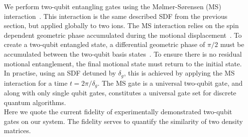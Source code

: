     We perform two-qubit entangling gates using the Mølmer-Sørensen (MS)
    interaction~\cite{sorensen2000entanglement}. This interaction is the same described SDF from the
    previous section, but applied globally to two ions. The MS interaction
    relies on the spin dependent geometric phase accumulated during the motional
    displacement~\cite{ozeri2011tutorial}. To create a two-qubit entangled state, a differential
    geometric phase of $\pi/2$ must be accumulated between the two-qubit basis
    states~\cite{ozeri2011tutorial}. To ensure there is no residual motional entanglement, the final
    motional state must return to the initial state. In practise, using an SDF
    detuned by $\delta_g$, this is achieved by applying the MS interaction for a
    time $t = 2\pi/\delta_g$. The MS gate is a universal two-qubit gate, and
    along with only single qubit gates, constitutes a universal gate set for
    discrete quantum algorithms.\\  
    Here we quote the current fidelity of experimentally demonstrated two-qubit gates on
    our system. The fidelity serves to quantify the similarity of
    two density matrices. 
